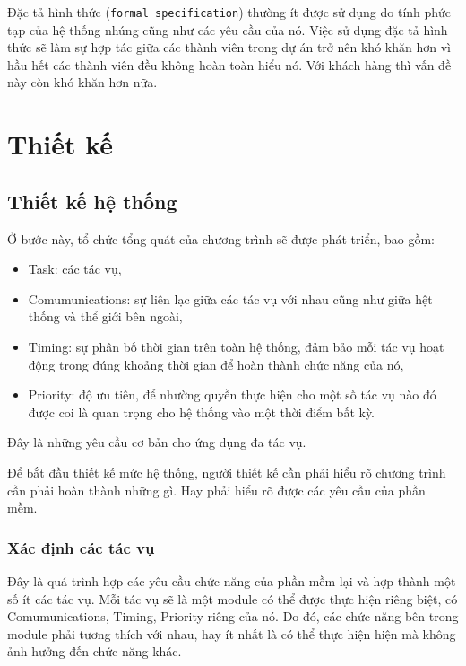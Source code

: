         Đặc tả hình thức (\texttt{formal specification}) thường ít được sử
        dụng do tính phức tạp của hệ thống nhúng cũng như các yêu cầu của nó.
        Việc sử dụng đặc tả hình thức sẽ làm sự hợp tác giữa các thành viên
        trong dự án trở nên khó khăn hơn vì hầu hết các thành viên đều không
        hoàn toàn hiểu nó. Với khách hàng thì vấn đề này còn khó khăn hơn nữa.

    \section{Thiết kế}
        \subsection{Thiết kế hệ thống}
            Ở bước này, tổ chức tổng quát của chương trình sẽ được phát triển,
            bao gồm:
            \begin{itemize}
                \item Task: các tác vụ, 
                \item Comumunications:  sự liên lạc giữa các tác vụ với
            nhau cũng như giữa hệt thống và thể giới bên ngoài, 
                \item Timing:  sự phân bố thời gian trên toàn hệ thống, đảm bảo mỗi tác
                    vụ hoạt động trong đúng khoảng thời gian để hoàn thành chức
                    năng của nó,
                \item Priority: độ ưu tiên, để nhường quyền thực hiện cho một số tác vụ
                    nào đó được coi là quan trọng cho hệ thống vào một thời
                    điểm bất kỳ.
            \end{itemize}

            Đây là những yêu cầu cơ bản cho ứng dụng đa tác vụ. 

            Để bắt đầu thiết kế mức hệ thống, người thiết kế cần phải hiểu rõ
            chương trình cần phải hoàn thành những gì. Hay phải hiểu rõ được
            các yêu cầu của phần mềm.

            \subsubsection{Xác định các tác vụ}
                Đây là quá trình hợp các yêu cầu chức năng của phần mềm lại
                và hợp thành một số ít các tác vụ. Mỗi tác vụ sẽ là một module
                có thể được thực hiện riêng biệt, có Comumunications, Timing,
                Priority riêng của nó. Do đó, các chức năng bên trong module
                phải tương thích với nhau, hay ít nhất là có thể thực hiện hiện
                mà không ảnh hưởng đến chức năng khác.

